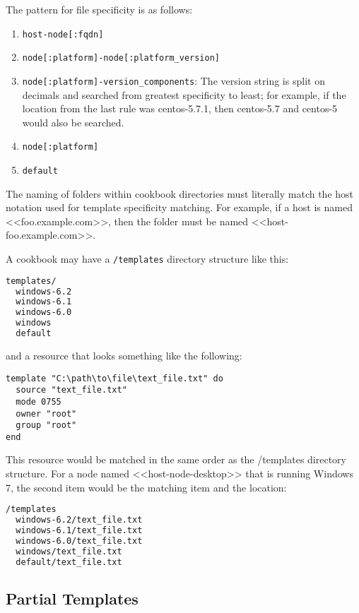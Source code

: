The pattern for file specificity is as follows:

\begin{enumerate}
  \item \lstinline!host-node[:fqdn]!
  \item \lstinline!node[:platform]-node[:platform_version]!
  \item \lstinline!node[:platform]-version_components!: The version string is split on decimals and searched from greatest specificity to least; for example, if the location from the last rule was centos-5.7.1, then centos-5.7 and centos-5 would also be searched.
  \item \lstinline!node[:platform]!
  \item \lstinline!default!
\end{enumerate}

The naming of folders within cookbook directories must literally match the host notation used for template specificity matching. For example, if a host is named <<foo.example.com>>, then the folder must be named <<host-foo.example.com>>.

A cookbook may have a \lstinline!/templates! directory structure like this:

\begin{lstlisting}[language=Bash,label=lst:cookbook-templates7]
templates/
  windows-6.2
  windows-6.1
  windows-6.0
  windows
  default
\end{lstlisting}

and a resource that looks something like the following:

\begin{lstlisting}[label=lst:cookbook-templates8]
template "C:\path\to\file\text_file.txt" do
  source "text_file.txt"
  mode 0755
  owner "root"
  group "root"
end
\end{lstlisting}

This resource would be matched in the same order as the /templates directory structure. For a node named <<host-node-desktop>> that is running Windows 7, the second item would be the matching item and the location:

\begin{lstlisting}[language=Bash,label=lst:cookbook-templates9]
/templates
  windows-6.2/text_file.txt
  windows-6.1/text_file.txt
  windows-6.0/text_file.txt
  windows/text_file.txt
  default/text_file.txt
\end{lstlisting}

\subsection{Partial Templates}

